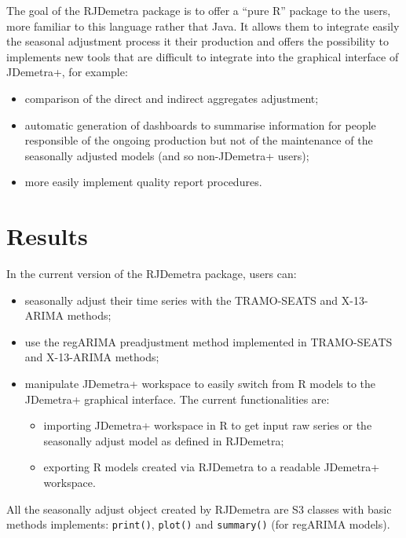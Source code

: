 \documentclass[12pt,a4paper]{article}
\begin{document}
The goal of the RJDemetra package is to offer a ``pure R'' package to
the users, more familiar to this language rather that Java. It allows
them to integrate easily the seasonal adjustment process it their
production and offers the possibility to implements new tools that are
difficult to integrate into the graphical interface of JDemetra+, for
example:

\begin{itemize}
\item
  comparison of the direct and indirect aggregates adjustment;
\item
  automatic generation of dashboards to summarise information for people
  responsible of the ongoing production but not of the maintenance of
  the seasonally adjusted models (and so non-JDemetra+ users);
\item
  more easily implement quality report procedures.
\end{itemize}

\section{Results}\label{results}

In the current version of the RJDemetra package, users can:

\begin{itemize}
\item
  seasonally adjust their time series with the TRAMO-SEATS and
  X-13-ARIMA methods;
\item
  use the regARIMA preadjustment method implemented in TRAMO-SEATS and
  X-13-ARIMA methods;
\item
  manipulate JDemetra+ workspace to easily switch from R models to the
  JDemetra+ graphical interface. The current functionalities are:

  \begin{itemize}
  \item
    importing JDemetra+ workspace in R to get input raw series or the
    seasonally adjust model as defined in RJDemetra;
  \item
    exporting R models created via RJDemetra to a readable JDemetra+
    workspace.
  \end{itemize}
\end{itemize}

All the seasonally adjust object created by RJDemetra are S3 classes
with basic methods implements: \texttt{print()}, \texttt{plot()} and
\texttt{summary()} (for regARIMA models).
\end{document}

